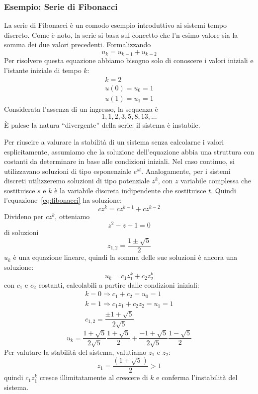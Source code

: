 \documentclass[a4paper]{report}
\begin{document}
\subsubsection{Esempio: Serie di Fibonacci}
La serie di Fibonacci \`e un comodo esempio introduttivo ai sistemi
tempo discreto. Come \`e noto, la serie si basa sul concetto che
l'n-esimo valore sia la somma dei due valori precedenti. Formalizzando
\begin{equation}\label{eq:fibonacci}
u_k = u_{k-1} + u_{k-2}
\end{equation}
Per risolvere questa equazione abbiamo bisogno solo di conoscere i
valori iniziali e l'istante iniziale di tempo $k$:
\[
\begin{array}{l}
  k = 2\\
  u(0) = u_0 = 1\\
  u(1) = u_1 = 1
\end{array}
\]
Considerata l'assenza di un ingresso, la sequenza \`e
\[
1,1,2,3,5,8,13,...
\]
\`E palese la natura ``divergente'' della serie: il sistema \`e
instabile.

Per riuscire a valurare la stabilit\`a di un sistema senza calcolarne
i valori esplicitamente, assumiamo che la soluzione dell'equazione
abbia una struttura con costanti da determinare in base alle
condizioni iniziali. Nel caso continuo, si utilizzavano soluzioni di
tipo esponenziale $e^{st}$. Analogamente, per i sistemi discreti
utilizzeremo soluzioni di tipo potenziale $z^k$, con $z$ variabile
complessa che sostituisce $s$ e $k$ \`e la variabile discreta
indipendente che sostituisce $t$. Quindi
l'equazione~\ref{eq:fibonacci} ha soluzione: 
\begin{equation}\label{eq:fibonacci02}
  cz^k = cz^{k-1} + cz^{k-2}
\end{equation}
Divideno per $cz^k$, otteniamo
\[
z^2 - z -1 = 0
\]
di soluzioni
\[
z_{1,2} = \dfrac{1 \pm \sqrt{5}}{2}
\]
$u_k$ \`e una equazione lineare, quindi la somma delle sue soluzioni
\`e ancora una soluzione:
\[
u_k = c_1 z_1^k + c_2z_2^k
\]
con $c_1$ e $c_2$ costanti, calcolabili a partire dalle condizioni
iniziali:
\[
\begin{array}{l}
  k = 0 \Rightarrow  c_1 + c_2 = u_0 = 1\\
  k = 1 \Rightarrow  c_1z_1 + c_2z_2 = u_1 = 1\\
  c_{1,2} = \dfrac{\pm 1 + \sqrt{5}}{2 \sqrt{5}}
\end{array}
\]
\[
u_k = \dfrac{1 + \sqrt{5}}{2 \sqrt{5}}\dfrac{1 + \sqrt{5}}{2} +
\dfrac{-1 + \sqrt{5}}{2 \sqrt{5}}\dfrac{1 - \sqrt{5}}{2} 
\]
Per valutare la stabilit\`a del sistema, valutiamo $z_1$ e $z_2$:
\[
z_1 = \dfrac{(1 + \sqrt{5})}{2} > 1
\]
quindi $c_1z_1^k$ cresce illimitatamente al crescere di $k$ e conferma
l'instabilit\`a del sistema.
\end{document}
